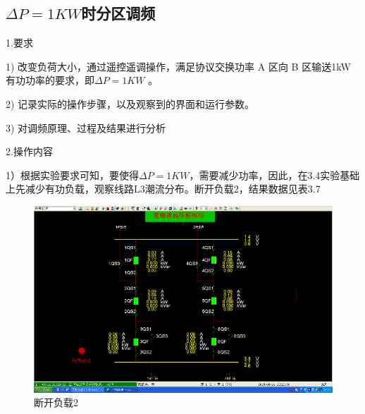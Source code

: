 \documentclass[a4paper]{ctexrep}
\begin{document}
                    \subsection{$\Delta P=1KW$时分区调频}
                        \noindent 1.要求 
                       
                        1) 改变负荷大小，通过遥控遥调操作，满足协议交换功率 A 区向 B 区输送1kW 有功功率的要求，即$\Delta P=1KW$ 。
                       
                        2) 记录实际的操作步骤，以及观察到的界面和运行参数。 
                        
                        3) 对调频原理、过程及结果进行分析
                        
                        \noindent 2.操作内容
                        
                        1）根据实验要求可知，要使得$\Delta P=1KW$，需要减少功率，因此，在3.4实验基础上先减少有功负载，观察线路L3潮流分布。断开负载2，结果数据见表3.7

                        \begin{figure}[htbp]
                            \centering
                            \includegraphics[width=12cm]{9.png}
                            \caption{断开负载2}
                        \end{figure}
                        
\end{document}
